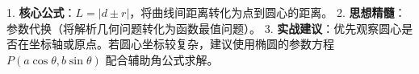 \begin{summarybox}
1. \textbf{核心公式}：$L = |d \pm r|$，将曲线间距离转化为点到圆心的距离。
2. \textbf{思想精髓}：参数代换（将解析几何问题转化为函数最值问题）。
3. \textbf{实战建议}：优先观察圆心是否在坐标轴或原点。若圆心坐标较复杂，建议使用椭圆的参数方程 $P(a\cos\theta, b\sin\theta)$ 配合辅助角公式求解。
\end{summarybox}